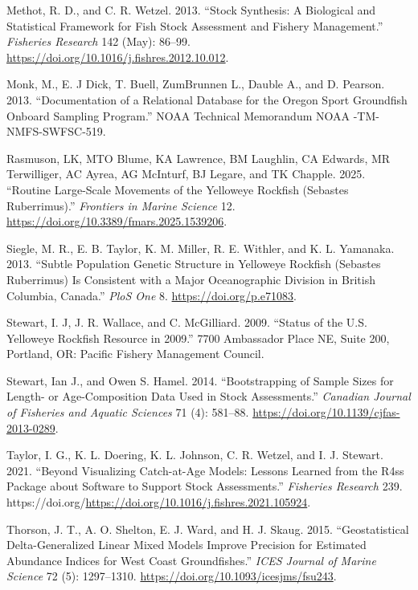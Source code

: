 \documentclass[
]{scrartcl}
\newlength{\cslhangindent}
\newenvironment{CSLReferences}[2] %
 {\begin{list}{}{%
  \setlength{\itemindent}{0pt}
  \setlength{\leftmargin}{0pt}
  \setlength{\parsep}{0pt}
  \ifodd #1
   \setlength{\leftmargin}{\cslhangindent}
   \setlength{\itemindent}{-1\cslhangindent}
  \fi
  \setlength{\itemsep}{#2\baselineskip}}}
 {\end{list}}
\begin{document}
\begin{CSLReferences}{1}{0}
Methot, R. D., and C. R. Wetzel. 2013. {``Stock Synthesis: A Biological
and Statistical Framework for Fish Stock Assessment and Fishery
Management.''} \emph{Fisheries Research} 142 (May): 86--99.
\url{https://doi.org/10.1016/j.fishres.2012.10.012}.

Monk, M., E. J Dick, T. Buell, ZumBrunnen L., Dauble A., and D. Pearson.
2013. {``Documentation of a Relational Database for the Oregon Sport
Groundfish Onboard Sampling Program.''} NOAA Technical Memorandum NOAA
-TM-NMFS-SWFSC-519.

Rasmuson, LK, MTO Blume, KA Lawrence, BM Laughlin, CA Edwards, MR
Terwilliger, AC Ayrea, AG McInturf, BJ Legare, and TK Chapple. 2025.
{``Routine Large-Scale Movements of the Yelloweye Rockfish (Sebastes
Ruberrimus).''} \emph{Frontiers in Marine Science} 12.
\url{https://doi.org/10.3389/fmars.2025.1539206}.

Siegle, M. R., E. B. Taylor, K. M. Miller, R. E. Withler, and K. L.
Yamanaka. 2013. {``Subtle Population Genetic Structure in Yelloweye
Rockfish (Sebastes Ruberrimus) Is Consistent with a Major Oceanographic
Division in British Columbia, Canada.''} \emph{PloS One} 8.
\url{https://doi.org/p.e71083}.

Stewart, I. J, J. R. Wallace, and C. McGilliard. 2009. {``Status of the
{U}.{S}. Yelloweye Rockfish Resource in 2009.''} 7700 Ambassador Place
NE, Suite 200, Portland, OR: Pacific Fishery Management Council.

Stewart, Ian J., and Owen S. Hamel. 2014. {``Bootstrapping of Sample
Sizes for Length- or Age-Composition Data Used in Stock Assessments.''}
\emph{Canadian Journal of Fisheries and Aquatic Sciences} 71 (4):
581--88. \url{https://doi.org/10.1139/cjfas-2013-0289}.

Taylor, I. G., K. L. Doering, K. L. Johnson, C. R. Wetzel, and I. J.
Stewart. 2021. {``Beyond Visualizing Catch-at-Age Models: Lessons
Learned from the R4ss Package about Software to Support Stock
Assessments.''} \emph{Fisheries Research} 239.
https://doi.org/\url{https://doi.org/10.1016/j.fishres.2021.105924}.

Thorson, J. T., A. O. Shelton, E. J. Ward, and H. J. Skaug. 2015.
{``Geostatistical Delta-Generalized Linear Mixed Models Improve
Precision for Estimated Abundance Indices for {West} {Coast}
Groundfishes.''} \emph{ICES Journal of Marine Science} 72 (5):
1297--1310. \url{https://doi.org/10.1093/icesjms/fsu243}.


\end{CSLReferences}
\end{document}
